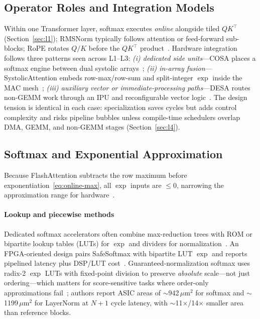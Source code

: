 \documentclass[conference]{IEEEtran}
\begin{document}
\subsection{Operator Roles and Integration Models}
\label{sec:l3-operators}

Within one Transformer layer, softmax executes \emph{online} alongside tiled $QK^\top$ (Section~\ref{sec:l1}); RMSNorm typically follows attention or feed-forward sub-blocks; RoPE rotates $Q/K$ before the $QK^\top$ product~\cite{su2024roformer,zhang2019root}.
Hardware integration follows three patterns seen across L1--L3:
\emph{(i) dedicated side units}---COSA places a softmax engine between dual systolic arrays~\cite{wang2023cosa};
\emph{(ii) in-array fusion}---SystolicAttention embeds row-max/row-sum and split-integer $\exp$ inside the MAC mesh~\cite{lin2025systolicattention,koca2023exp};
\emph{(iii) auxiliary vector or immediate-processing paths}---DESA routes non-GEMM work through an IPU and reconfigurable vector logic~\cite{desa2025}.
The design tension is identical in each case: specialization saves cycles but adds control complexity and risks pipeline bubbles unless compile-time schedulers overlap DMA, GEMM, and non-GEMM stages (Section~\ref{sec:l4}).

\subsection{Softmax and Exponential Approximation}
\label{sec:l3-softmax}

Because FlashAttention subtracts the row maximum before exponentiation~\eqref{eq:online-max}, all $\exp$ inputs are $\leq 0$, narrowing the approximation range for hardware~\cite{dao2022flashattention,lin2025systolicattention}.

\paragraph{Lookup and piecewise methods}
Dedicated softmax accelerators often combine max-reduction trees with ROM or bipartite lookup tables (LUTs) for $\exp$ and dividers for normalization~\cite{softmaxrmsnorm2026,guaranteednorm2026,mive2026,ham2021a3}.
An FPGA-oriented design pairs SafeSoftmax with bipartite LUT $\exp$ and reports pipelined latency plus DSP/LUT cost~\cite{softmaxrmsnorm2026}.
Guaranteed-normalization softmax uses radix-2 $\exp$ LUTs with fixed-point division to preserve \emph{absolute} scale---not just ordering---which matters for score-sensitive tasks where order-only approximations fail~\cite{guaranteednorm2026}; authors report ASIC areas of $\sim$942\,$\mu$m$^2$ for softmax and $\sim$1199\,$\mu$m$^2$ for LayerNorm at $N{+}1$ cycle latency, with $\sim$11$\times$/14$\times$ smaller area than reference blocks.
\end{document}
